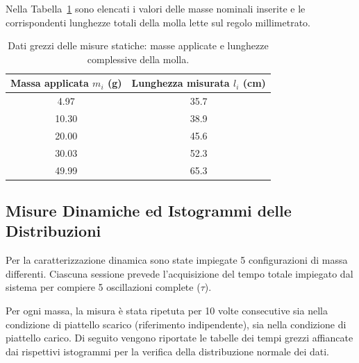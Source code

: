 \documentclass[a4paper,12pt]{article}
\begin{document}
Nella Tabella~\ref{tab:misure_statiche} sono elencati i valori delle masse nominali inserite e le corrispondenti lunghezze totali della molla lette sul regolo millimetrato.

\begin{table}[h!]
\centering
\begin{tabular}{cc}
\hline
\textbf{Massa applicata $m_i$ (g)} & \textbf{Lunghezza misurata $l_i$ (cm)} \\ \hline
4.97 & 35.7 \\
10.30 & 38.9 \\
20.00 & 45.6 \\
30.03 & 52.3 \\
49.99 & 65.3 \\ \hline
\end{tabular}
\caption{Dati grezzi delle misure statiche: masse applicate e lunghezze complessive della molla.}
\label{tab:misure_statiche}
\end{table}

\subsection{Misure Dinamiche ed Istogrammi delle Distribuzioni}
Per la caratterizzazione dinamica sono state impiegate 5 configurazioni di massa differenti. Ciascuna sessione prevede l'acquisizione del tempo totale impiegato dal sistema per compiere 5 oscillazioni complete ($\tau$). 

Per ogni massa, la misura è stata ripetuta per 10 volte consecutive sia nella condizione di piattello scarico (riferimento indipendente), sia nella condizione di piattello carico. Di seguito vengono riportate le tabelle dei tempi grezzi affiancate dai rispettivi istogrammi per la verifica della distribuzione normale dei dati.

\end{document}
